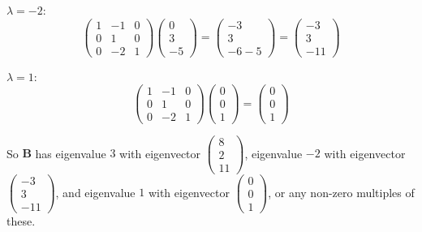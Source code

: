\documentclass[leqno]{article}
\begin{document}
\begin{enumerate}[
  label=\textbf{\arabic*.},
  leftmargin=*,
  topsep=0pt,
  partopsep=0pt,
  parsep=0pt
]
\begin{djsSolution}
\begin{enumerate}[label=\textbf{(\alph*)}, start=1]
\(\lambda=-2\):
\[
\begin{pmatrix}1&-1&0\\0&1&0\\0&-2&1\end{pmatrix}\begin{pmatrix}0\\3\\-5\end{pmatrix}=\begin{pmatrix}-3\\3\\-6-5\end{pmatrix}=\begin{pmatrix}-3\\3\\-11\end{pmatrix}
\]

\(\lambda=1\):
\[
\begin{pmatrix}1&-1&0\\0&1&0\\0&-2&1\end{pmatrix}\begin{pmatrix}0\\0\\1\end{pmatrix}=\begin{pmatrix}0\\0\\1\end{pmatrix}
\]

So \(\mathbf{B}\) has eigenvalue \(3\) with eigenvector \(\begin{pmatrix}8\\2\\11\end{pmatrix}\), eigenvalue \(-2\) with eigenvector \(\begin{pmatrix}-3\\3\\-11\end{pmatrix}\), and eigenvalue \(1\) with eigenvector \(\begin{pmatrix}0\\0\\1\end{pmatrix}\), or any non-zero multiples of these.
\end{enumerate}
\end{djsSolution}

\newpage

\questionitem


\end{enumerate}
\end{document}
